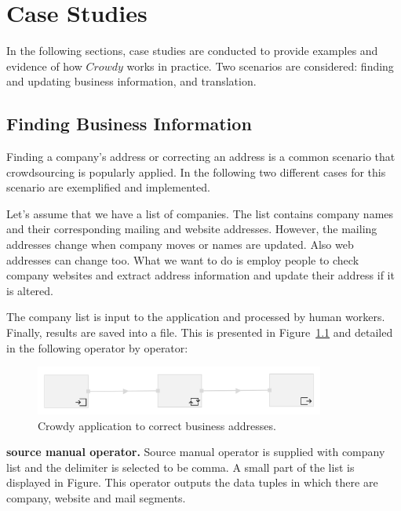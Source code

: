 \chapter{Case Studies}
\label{chap:examples}

In the following sections, case studies are conducted to provide examples 
and evidence of how $Crowdy$ works in practice. Two scenarios are considered: 
finding and updating business information, and translation.

\section{Finding Business Information}
Finding a company's address or correcting an address is a common scenario that crowdsourcing is popularly applied. In the following two different cases for this scenario are exemplified and implemented.

Let's assume that we have a list of companies. The list contains company names and their corresponding mailing and website addresses. However, the mailing addresses change when company moves or names are updated. Also web addresses can change too. What we want to do is employ people to check company websites and extract address information and update their address if it is altered.

The company list is input to the application and processed by human workers. Finally, results are saved into a file. This is presented in Figure~\ref{fig:scenario1} and detailed in the following operator by operator:

\begin{figure}[ht]
	\centering
	\includegraphics[width=0.85\textwidth]{figures/scenarios/naive.png}
	\caption{Crowdy application to correct business addresses.}
	\label{fig:scenario1}
\end{figure}

\textbf{source manual operator.}
Source manual operator is supplied with company list and the delimiter is selected to be comma. A small part of the list is displayed in Figure. This operator outputs the data tuples in which there are company, website and mail segments.


